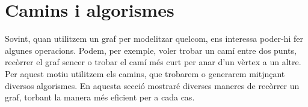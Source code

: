 \documentclass[english]{article}
\begin{document}
\section{Camins i algorismes}

Sovint, quan utilitzem un graf per modelitzar quelcom, ens interessa poder-hi fer algunes operacions. Podem, per exemple, voler trobar un camí entre dos punts, recòrrer el graf sencer o  trobar el camí més curt per anar d'un vèrtex a un altre. Per aquest motiu utilitzem els camins, que trobarem o generarem mitjnçant diversos algorismes. En aquesta secció mostraré diverses maneres de recòrrer un graf, torbant la manera més eficient per a cada cas.
\end{document}
